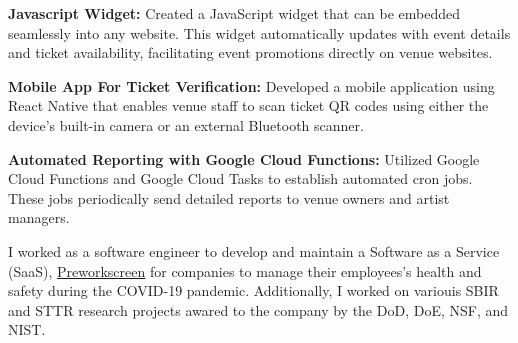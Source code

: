 \documentclass[]{deedy-resume-openfont}
\begin{document}
\begin{minipage}[t]{0.66\textwidth}
\begin{tightemize}
	\vspace{.05in} %
\item {\selectfont\bfseries Javascript Widget:}
    Created a JavaScript widget that can be embedded seamlessly into any
    website. This widget automatically updates with event details and ticket
    availability, facilitating event promotions directly on venue websites.
	\vspace{.05in} %
\item {\selectfont\bfseries Mobile App For Ticket Verification:}
    Developed a mobile application using React Native that enables venue staff
    to scan ticket QR codes using either the device’s built-in camera or an
    external Bluetooth scanner.
	\vspace{.05in} %
\item {\selectfont\bfseries Automated Reporting with Google Cloud Functions:}
    Utilized Google Cloud Functions and Google Cloud Tasks to establish
    automated cron jobs. These jobs periodically send detailed reports to venue
    owners and artist managers.
	\vspace{.05in} %
\end{tightemize}
\sectionsep

\vspace{.05in} %

I worked as a software engineer to develop and maintain a Software as a Service
(SaaS), \href{https://www.preworkscreen.com}{Preworkscreen} for companies to
manage their employees's health and safety during the COVID-19 pandemic.
Additionally, I worked on variouis SBIR and STTR research projects awared to
the company by the DoD, DoE, NSF, and NIST.


\end{minipage}
\end{document}
